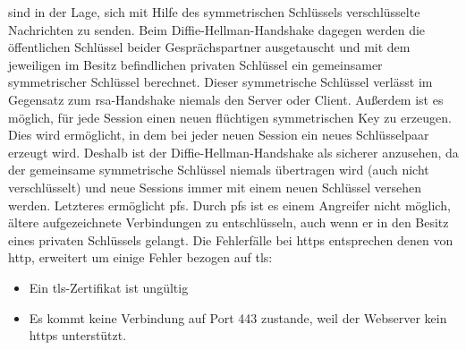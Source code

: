 \documentclass[titlepage]{report}
\begin{document}
sind in der Lage, sich mit Hilfe des symmetrischen Schlüssels
verschlüsselte Nachrichten zu senden. Beim
Diffie\hyp{}Hellman\hyp{}Handshake dagegen werden die öffentlichen
Schlüssel beider Gesprächspartner ausgetauscht und mit dem jeweiligen im
Besitz befindlichen privaten Schlüssel ein gemeinsamer symmetrischer
Schlüssel berechnet. Dieser symmetrische Schlüssel verlässt im Gegensatz
zum \gls{rsa}\hyp{}Handshake niemals den Server oder Client. Außerdem
ist es möglich, für jede Session einen neuen flüchtigen symmetrischen Key
zu erzeugen. Dies wird ermöglicht, in dem bei jeder neuen Session ein
neues Schlüsselpaar erzeugt wird. Deshalb ist der
Diffie\hyp{}Hellman\hyp{}Handshake als sicherer anzusehen, da der
gemeinsame symmetrische Schlüssel niemals übertragen wird (auch nicht
verschlüsselt) und neue Sessions immer mit einem neuen Schlüssel
versehen werden. Letzteres ermöglicht \gls{pfs}. Durch \gls{pfs} ist es
einem Angreifer nicht möglich, ältere aufgezeichnete Verbindungen zu
entschlüsseln, auch wenn er in den Besitz eines privaten Schlüssels
gelangt.
Die Fehlerfälle bei \gls{https} entsprechen denen von \gls{http}, 
erweitert um einige Fehler bezogen auf \gls{tls}:
\begin{itemize}
    \item Ein \gls{tls}\hyp{}Zertifikat ist ungültig
    \item Es kommt keine Verbindung auf Port 443 zustande, weil der
          Webserver kein \gls{https} unterstützt.
\end{itemize}
\end{document}
